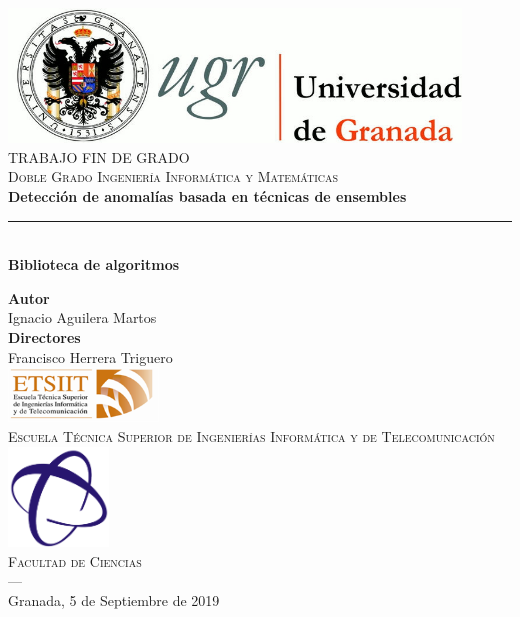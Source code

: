\begin{titlepage}
 
 
\newlength{\centeroffset}
\setlength{\centeroffset}{-0.5\oddsidemargin}
\addtolength{\centeroffset}{0.5\evensidemargin}
\thispagestyle{empty}

\noindent\hspace*{\centeroffset}\begin{minipage}{\textwidth}

\centering
\includegraphics[width=0.9\textwidth]{imagenes/logos/logo_ugr.jpg}\\[1.4cm]

\textsc{ \Large TRABAJO FIN DE GRADO\\[0.2cm]}
\textsc{ Doble Grado Ingeniería Informática y Matemáticas}\\[1cm]
% 
{\Huge\bfseries Detección de anomalías basada en técnicas de ensembles\\
}
\noindent\rule[-1ex]{\textwidth}{3pt}\\[3.5ex]
{\large\bfseries Biblioteca de algoritmos}
\end{minipage}

\vspace{2.5cm}
\noindent\hspace*{\centeroffset}\begin{minipage}{\textwidth}
\centering

\textbf{Autor}\\ {Ignacio Aguilera Martos}\\[2.5ex]
\textbf{Directores}\\
{Francisco Herrera Triguero}\\[2cm]
\includegraphics[width=0.3\textwidth]{imagenes/logos/etsiit_logo.png}\\[0.1cm]
\textsc{Escuela Técnica Superior de Ingenierías Informática y de Telecomunicación}\\
\includegraphics[width=0.2\textwidth]{imagenes/logos/ciencias.png}\\[0.1cm]
\textsc{Facultad de Ciencias}\\
\textsc{---}\\
Granada, 5 de Septiembre de 2019
\end{minipage}
\end{titlepage}


